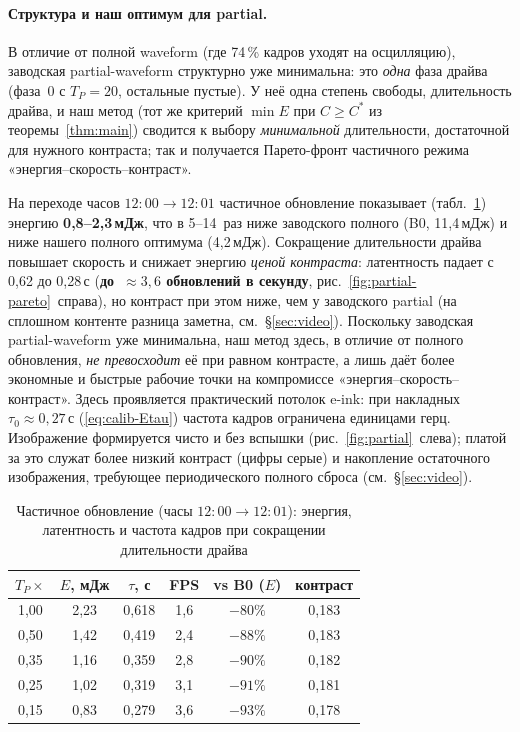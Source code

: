 \paragraph{Структура и наш оптимум для partial.} В отличие от полной waveform
(где 74\,\% кадров уходят на осцилляцию), заводская partial-waveform структурно
уже минимальна: это \emph{одна} фаза драйва (фаза~0 с
$T_P{=}20$, остальные пустые). У неё одна степень
свободы, длительность драйва, и наш метод (тот же критерий
$\min E$ при $C\ge C^{*}$ из теоремы~\ref{thm:main}) сводится к выбору
\emph{минимальной} длительности, достаточной для нужного контраста; так и
получается Парето-фронт частичного режима «энергия--скорость--контраст».

На переходе часов $12{:}00\to12{:}01$ частичное обновление показывает
(табл.~\ref{tab:partial}) энергию \textbf{0{,}8--2{,}3\,мДж}, что в 5--14~раз ниже
заводского полного (B0, 11{,}4\,мДж) и ниже нашего полного оптимума (4{,}2\,мДж).
Сокращение длительности драйва повышает скорость и снижает энергию \emph{ценой
контраста}: латентность падает с 0{,}62 до 0{,}28\,с (\textbf{до~$\approx3{,}6$ обновлений в секунду}, рис.~\ref{fig:partial-pareto}~справа), но
контраст при этом ниже, чем у заводского partial (на сплошном контенте разница
заметна, см.~\S\ref{sec:video}). Поскольку заводская partial-waveform уже
минимальна, наш метод здесь, в отличие от полного обновления,
\emph{не превосходит} её при равном контрасте, а лишь даёт более экономные и
быстрые рабочие точки на компромиссе «энергия--скорость--контраст».
Здесь проявляется практический потолок e-ink: при накладных $\tau_0\approx0{,}27$\,с
(\eqref{eq:calib-Etau}) частота кадров ограничена единицами герц. Изображение формируется чисто и без вспышки (рис.~\ref{fig:partial}~слева); платой
за это служат более низкий контраст (цифры серые) и накопление остаточного
изображения, требующее периодического полного сброса (см.~\S\ref{sec:video}).

\begin{table}[ht]
    \centering
    \caption{Частичное обновление (часы $12{:}00\to12{:}01$): энергия, латентность
        и частота кадров при сокращении длительности драйва}\label{tab:partial}
    \small
    \begin{tabular}{cccccc}
        \toprule
        $T_P{\times}$ & $E$, мДж & $\tau$, с & FPS & vs B0 ($E$) & контраст\\
        \midrule
        1{,}00 & 2{,}23 & 0{,}618 & 1{,}6 & $-80\%$ & 0{,}183 \\
        0{,}50 & 1{,}42 & 0{,}419 & 2{,}4 & $-88\%$ & 0{,}183 \\
        0{,}35 & 1{,}16 & 0{,}359 & 2{,}8 & $-90\%$ & 0{,}182 \\
        0{,}25 & 1{,}02 & 0{,}319 & 3{,}1 & $-91\%$ & 0{,}181 \\
        0{,}15 & 0{,}83 & 0{,}279 & 3{,}6 & $-93\%$ & 0{,}178 \\
        \bottomrule
    \end{tabular}
\end{table}

